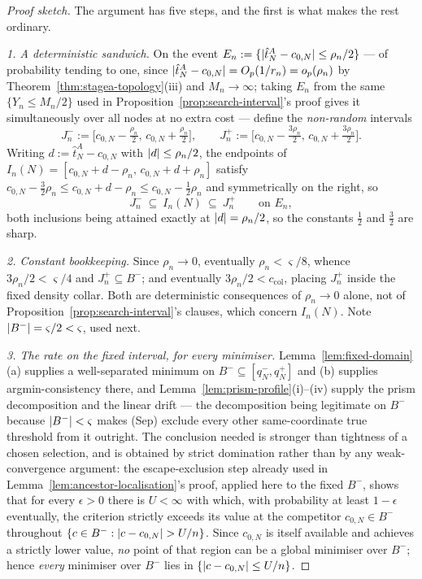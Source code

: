 \documentclass[11pt]{article}
\theoremstyle{plain}
\theoremstyle{definition}
\theoremstyle{remark}
\DeclarePairedDelimiter{\abs}{\lvert}{\rvert}
\begin{document}
\begin{proof}[Proof sketch]
The argument has five steps, and the first is what makes the rest ordinary.

\emph{1. A deterministic sandwich.} On the event
\(E_n:=\{\abs{\hat t^A_N-c_{0,N}}\le\rho_n/2\}\) --- of probability tending to
one, since \(\abs{\hat t^A_N-c_{0,N}}=O_p(1/r_n)=o_p(\rho_n)\) by
Theorem~\ref{thm:stagea-topology}(iii) and \(M_n\to\infty\); taking \(E_n\)
from the same \(\{Y_n\le M_n/2\}\) used in
Proposition~\ref{prop:search-interval}'s proof gives it simultaneously over
all nodes at no extra cost --- define the \emph{non-random} intervals
\[
  J_n^-:=\bigl[c_{0,N}-\tfrac{\rho_n}2,\,c_{0,N}+\tfrac{\rho_n}2\bigr],
  \qquad
  J_n^+:=\bigl[c_{0,N}-\tfrac{3\rho_n}2,\,c_{0,N}+\tfrac{3\rho_n}2\bigr].
\]
Writing \(d:=\hat t^A_N-c_{0,N}\) with \(\abs d\le\rho_n/2\), the endpoints of
\(I_n(N)=[c_{0,N}+d-\rho_n,\,c_{0,N}+d+\rho_n]\) satisfy
\(c_{0,N}-\tfrac32\rho_n\le c_{0,N}+d-\rho_n\le c_{0,N}-\tfrac12\rho_n\) and
symmetrically on the right, so
\[
  J_n^-\ \subseteq\ I_n(N)\ \subseteq\ J_n^+
  \qquad\text{on }E_n,
\]
both inclusions being attained exactly at \(\abs d=\rho_n/2\), so the
constants \(\tfrac12\) and \(\tfrac32\) are sharp.

\emph{2. Constant bookkeeping.} Since \(\rho_n\to0\), eventually
\(\rho_n<\varsigma/8\), whence \(3\rho_n/2<\varsigma/4\) and
\(J_n^+\subseteq B^-\); and eventually \(3\rho_n/2<c_{\mathrm{col}}\), placing
\(J_n^+\) inside the fixed density collar. Both are deterministic consequences
of \(\rho_n\to0\) alone, not of
Proposition~\ref{prop:search-interval}'s clauses, which concern \(I_n(N)\).
Note \(\abs{B^-}=\varsigma/2<\varsigma\), used next.

\emph{3. The rate on the fixed interval, for \emph{every} minimiser.}
Lemma~\ref{lem:fixed-domain}(a) supplies a well-separated minimum on
\(B^-\subseteq[q_N^-,q_N^+]\) and (b) supplies argmin-consistency there, and
Lemma~\ref{lem:prism-profile}(i)--(iv) supply the prism decomposition and the
linear drift --- the decomposition being legitimate on \(B^-\) because
\(\abs{B^-}<\varsigma\) makes (Sep) exclude every other same-coordinate true
threshold from it outright. The conclusion needed is stronger than tightness
of a chosen selection, and is obtained by strict domination rather than by any
weak-convergence argument: the escape-exclusion step already used in
Lemma~\ref{lem:ancestor-localisation}'s proof, applied here to the fixed
\(B^-\), shows that for every \(\epsilon>0\) there is \(U<\infty\) with which,
with probability at least \(1-\epsilon\) eventually, the criterion strictly
exceeds its value at the competitor \(c_{0,N}\in B^-\) throughout
\(\{c\in B^-:\abs{c-c_{0,N}}>U/n\}\). Since \(c_{0,N}\) is itself available
and achieves a strictly lower value, \emph{no} point of that region can be a
global minimiser over \(B^-\); hence \emph{every} minimiser over \(B^-\) lies
in \(\{\abs{c-c_{0,N}}\le U/n\}\).


\end{proof}
\end{document}
